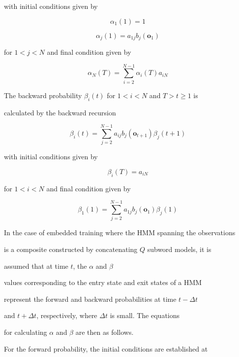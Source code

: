 with initial conditions given by 


\[


    \alpha_1(1) = 1


\]


\[


    \alpha_j(1) = a_{1j} b_j(\bm{o}_1)


\]


for $1<j<N$ and final condition given by


\[


    \alpha_N(T) = \sum_{i=2}^{N-1} \alpha_i(T) a_{iN}


\]





The backward probability $\beta_i(t)$ for $1<i<N$ and $T>t \geq 1$ is 


calculated by the backward recursion


\[


   \beta_i(t) = \sum_{j=2}^{N-1} a_{ij} b_j(\bm{o}_{t+1}) \beta_j(t+1)


\]


with initial conditions given by


\[


   \beta_i(T) = a_{iN}


\]


for $1<i<N$ and final condition given by


\[


   \beta_1(1) = \sum_{j=2}^{N-1} a_{1j} b_j(\bm{o}_1) \beta_j(1)


\]





In the case of embedded training where the HMM spanning the observations


is a composite constructed by concatenating $Q$ subword models, it is


assumed that at time $t$, the $\alpha$ and $\beta$


values corresponding to the entry state and exit states of a HMM


represent the forward and backward probabilities at time $t-\Delta t$


and $t+\Delta t$, respectively, where $\Delta t$ is small.  The equations


for calculating $\alpha$ and $\beta$ are then as follows.





For the forward probability, the initial conditions are established at


